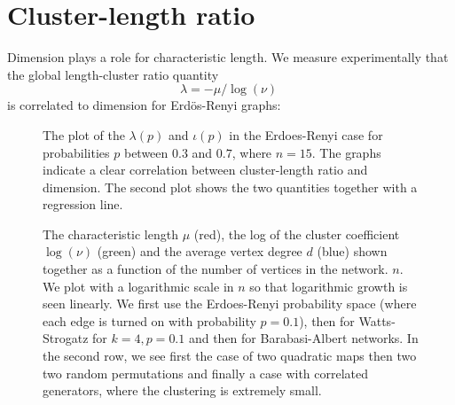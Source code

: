 \documentclass[12pt]{amsart}
\theoremstyle{definition}
\begin{document}
\section{Cluster-length ratio}

Dimension plays a role for characteristic length. 
We measure experimentally that the global length-cluster ratio quantity 
$$ \lambda = -\mu/\log(\nu) \;     $$
is correlated to dimension for Erd\"os-Renyi graphs: 

\begin{figure}
\caption{
The plot of the $\lambda(p)$ and $\iota(p)$ in the Erdoes-Renyi case
for probabilities $p$ between $0.3$ and $0.7$, where $n=15$. The graphs 
indicate a clear correlation between cluster-length ratio and dimension. 
The second plot shows the two quantities together with a regression line. }
\end{figure}

\begin{figure}
\caption{
The characteristic length $\mu$ (red), the log of the cluster coefficient $\log(\nu)$ (green)
and the average vertex degree $d$ (blue) shown together as a function of the number of vertices
in the network. $n$. We plot with a logarithmic
scale in $n$ so that logarithmic growth is seen linearly.
We first use the Erdoes-Renyi probability space (where each edge is turned on
with probability $p=0.1$), then for Watts-Strogatz for $k=4, p=0.1$ and then for 
Barabasi-Albert \cite{Barabasialbert}
networks. In the second row, we see first the case of two quadratic maps \cite{KnillOrbital3}
then two two random permutations and finally a case with correlated
generators, where the clustering is extremely small. 
}
\end{figure}
\end{document}
